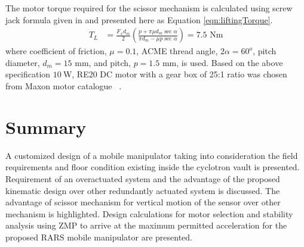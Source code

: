 The motor torque required for the scissor mechanism is calculated using  screw jack formula given in  \cite{TOMBook} and  presented here as Equation \ref{eqn:liftingTorque}. 
\begin{equation}
\label{eqn:liftingTorque}
\begin{aligned}
T_L&=\frac{F_x d_m}{2}(\frac{p+\pi\mu d_m\sec\alpha}{\pi d_m-\mu p\sec \alpha})=7.5\text{ Nm}
\end{aligned}
\end{equation}
where coefficient of friction, $\mu=0.1$, ACME thread angle, $2\alpha=60^o$, pitch diameter, $d_m=15$ mm, and pitch, $p=1.5$ mm, is used. Based on the above specification $10~$W, RE20 DC motor with a gear box of 25:1 ratio was chosen from Maxon motor catalogue ~\cite{catMaxon}.



  
  

\section{Summary}
A customized design of a mobile manipulator taking into consideration the field requirements and floor condition existing inside the cyclotron vault is presented. Requirement of an overactuated system and the advantage  of the proposed kinematic design over other redundantly actuated system is discussed. The advantage of scissor mechanism for vertical motion of the sensor over other mechanism is highlighted.
Design calculations for motor selection and stability analysis using ZMP to arrive at the maximum permitted acceleration for the proposed  RARS mobile manipulator are presented. 

 


